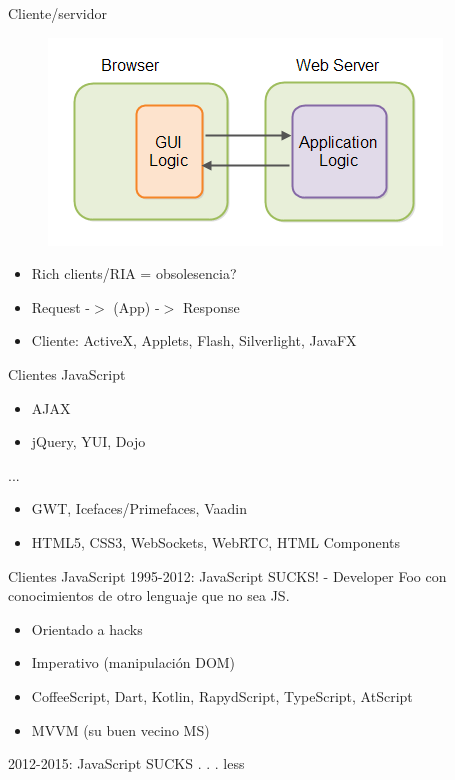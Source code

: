\documentclass{beamer}
\begin{document}
\begin{frame}{Cliente/servidor}
	\begin{figure}
\centering
\includegraphics[width=0.7\linewidth]{Images/ria}
\label{fig:ria}
\end{figure}
	\pause
	\begin{itemize}
	\item Rich clients/RIA = obsolesencia?
	\item Request -$>$ (App) -$>$ Response
	\item Cliente: ActiveX, Applets, Flash, Silverlight, JavaFX
	\end{itemize}
\end{frame}

\begin{frame}{Clientes JavaScript}
	\begin{itemize}
	\item AJAX
	\item jQuery, YUI, Dojo
	\end{itemize}
	...
	\begin{itemize}
	\item GWT, Icefaces/Primefaces, Vaadin
	\item HTML5, CSS3, WebSockets, WebRTC, HTML Components
	\end{itemize}
\end{frame}

\begin{frame}{Clientes JavaScript}
	1995-2012: JavaScript SUCKS! - Developer Foo con conocimientos de otro lenguaje que no sea JS.
		\begin{itemize}
			\item Orientado a hacks
			\item Imperativo (manipulación DOM)
			\item CoffeeScript, Dart, Kotlin, RapydScript, TypeScript, AtScript
			\item MVVM (su buen vecino MS)
		\end{itemize}
	2012-2015: JavaScript SUCKS . . . less
\end{frame}
\end{document}
